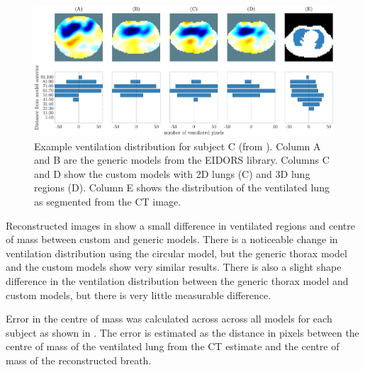 \begin{figure}[H]
	\centering
	\includegraphics[width=\textwidth]{chapter5-CT_to_mesh/imgs/center_of_vent_PT04.pdf}
	\caption[Example ventilation distributions]{\label{fig:c-of-m-results}%
	Example ventilation distribution for subject C (from ).
	Column A and B are the generic models from the EIDORS library. 
	Columns C and D show the custom models with 2D lungs (C) and 3D lung regions (D).
	Column E shows the distribution of the ventilated lung as segmented from the CT image. 
	}
\end{figure}

Reconstructed images in 
show a small difference in ventilated regions 
and centre of mass between custom and generic models. There is a 
noticeable change in ventilation distribution using the circular model, but the 
generic thorax model and the custom models show very similar results. 
There is also a slight shape difference in the ventilation distribution between the generic thorax model 
and custom models, but there is very little measurable difference. 

Error in the centre of mass was calculated across across all models for each subject 
as shown in . 
The error is estimated as the distance in pixels 
between the centre of mass of the ventilated lung from the CT estimate and the 
centre of mass of the reconstructed breath. 

